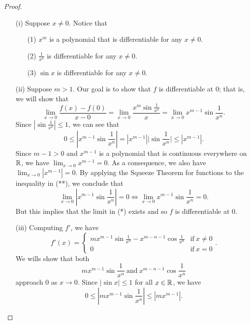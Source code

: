 \documentclass[a4paper]{article}
\begin{document}
\begin{proof}
\begin{enumerate}
    \item[(i)] Suppose \( x \neq 0  \). Notice that
        \begin{enumerate}
            \item[(1)] \( x^{m} \) is a polynomial that is differentiable for any \( x \neq 0  \).
            \item[(2)] \( \frac{ 1 }{ x^{n} }   \) is differentiable for any \( x \neq 0  \).
            \item[(3)] \( \sin x  \) is differentiable for any \( x \neq 0  \).
        \end{enumerate}
    \item[(ii)] Suppose \( m > 1  \). Our goal is to show that \( f  \) is differentiable at \( 0  \); that is, we will show that 
        \[  \lim_{ x \to 0 }  \frac{ f(x) - f(0) }{ x - 0 }  = \lim_{ x \to 0 }  \frac{ x^{m} \sin \frac{ 1 }{ x^{n} }   }{ x  } = \lim_{ x \to 0 }  x^{m-1} \sin \frac{ 1 }{ x^{n} }. \tag{*}  \]
        Since \( | \sin \frac{ 1 }{ x^{n} }  | \leq 1  \), we can see that 
        \[  0 \leq | x^{m-1} \sin \frac{ 1 }{ x^{n} }  | =  | x^{m-1} |  \Big| \sin \frac{ 1 }{ x^{n} }  \Big|   \leq | x^{m-1}  |. \tag{**}   \]
        Since \( m - 1 > 0  \) and \( x^{m-1} \) is a polynomial that is continuous everywhere on \(\mathbb{R}  \), we have \( \lim_{ x \to 0 }  x^{m-1} = 0  \). As a consequence, we also have \( \lim_{ x \to 0 } | x^{m-1} | = 0  \). By applying the Squeeze Theorem for functions to the inequality in (**), we conclude that 
        \[  \lim_{ x \to 0  }  | x^{m-1} \sin \frac{ 1 }{ x^{n} } |  = 0 \iff \lim_{ x \to 0 }  x^{m-1} \sin \frac{ 1 }{ x^{n} } = 0.  \]
        But this implies that the limit in (*) exists and so \( f  \) is differentiable at \(  0  \).
    \item[(iii)] Computing \( f' \), we have 
        \[  f'(x) = 
        \begin{cases}
            m x^{m-1} \sin \frac{ 1 }{ x^{n} }  - x^{m-n-1} \cos \frac{ 1 }{ x^{n} } &\text{if} \ x \neq 0 \\
            0 &\text{if} \ x = 0 
        \end{cases}. \]
        We wills show that both 
        \[  m x^{m-1} \sin \frac{ 1 }{ x^{n} } \ \text{and} \ x^{m-n-1} \cos \frac{ 1 }{ x^{n} }  \]
        approach \( 0 \) as \( x \to 0  \). Since \( | \sin x  | \leq 1  \) for all \( x \in \mathbb{R}  \), we have  
        \[   0 \leq | m x^{m-1} \sin \frac{ 1 }{ x^{n} }  | \leq | m x^{m-1} |. \tag{I}  \]

\end{enumerate}
\end{proof}
\end{document}
